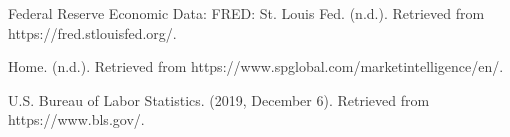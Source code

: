 \documentclass[12pt]{article}
\begin{document}
\vspace{\baselineskip}
\textcolor[HTML]{333333}{Federal Reserve Economic Data: FRED: St. Louis Fed. (n.d.). Retrieved from https://fred.stlouisfed.org/.}\par


\vspace{\baselineskip}
\textcolor[HTML]{333333}{Home. (n.d.). Retrieved from https://www.spglobal.com/marketintelligence/en/.}\par


\vspace{\baselineskip}
\textcolor[HTML]{333333}{U.S. Bureau of Labor Statistics. (2019, December 6). Retrieved from https://www.bls.gov/.}\par


\vspace{\baselineskip}

\printbibliography
\end{document}
